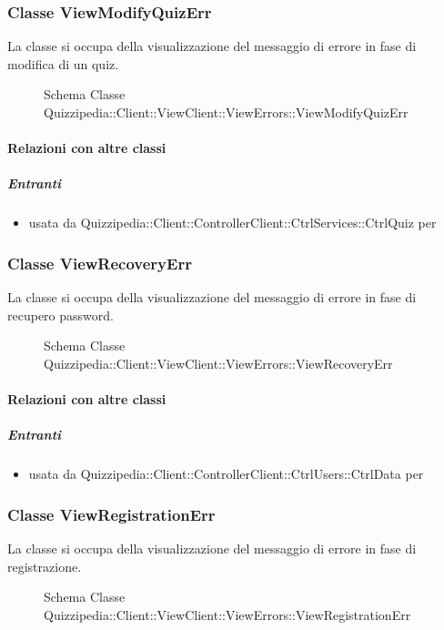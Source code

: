 \subsubsection{Classe ViewModifyQuizErr}
La classe si occupa della visualizzazione del messaggio di errore in fase di modifica di un quiz.
\begin{figure}[H]
\centering
\noindent{}
\caption[Schema Classe ViewModifyQuizErr]{Schema Classe Quizzipedia::Client::ViewClient::ViewErrors::ViewModifyQuizErr}
\end{figure}
\paragraph{Relazioni con altre classi}
\subparagraph{Entranti}
\begin{itemize}
\item usata da Quizzipedia::Client::ControllerClient::CtrlServices::CtrlQuiz per 
\end{itemize}
\subsubsection{Classe ViewRecoveryErr}
La classe si occupa della visualizzazione del messaggio di errore in fase di recupero password.
\begin{figure}[H]
\centering
\noindent{}
\caption[Schema Classe ViewRecoveryErr]{Schema Classe Quizzipedia::Client::ViewClient::ViewErrors::ViewRecoveryErr}
\end{figure}
\paragraph{Relazioni con altre classi}
\subparagraph{Entranti}
\begin{itemize}
\item usata da Quizzipedia::Client::ControllerClient::CtrlUsers::CtrlData per 
\end{itemize}
\subsubsection{Classe ViewRegistrationErr}
La classe si occupa della visualizzazione del messaggio di errore in fase di registrazione.
\begin{figure}[H]
\centering
\noindent{}
\caption[Schema Classe ViewRegistrationErr]{Schema Classe Quizzipedia::Client::ViewClient::ViewErrors::ViewRegistrationErr}
\end{figure}
